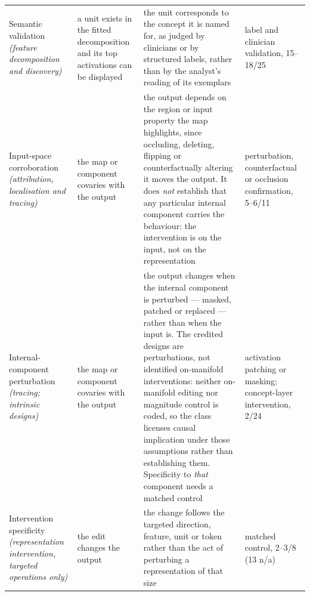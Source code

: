 \begin{table}
\begin{tabular}{@{}L{3.0cm}L{3.6cm}L{10.5cm}L{3.6cm}@{}}
Semantic validation \emph{(feature decomposition and discovery)} & a unit exists in the fitted decomposition and its top activations can be displayed & the unit corresponds to the concept it is named for, as judged by clinicians or by structured labels, rather than by the analyst's reading of its exemplars & label and clinician validation, 15--18/25 \\
Input-space corroboration \emph{(attribution, localisation and tracing)} & the map or component covaries with the output & the output depends on the region or input property the map highlights, since occluding, deleting, flipping or counterfactually altering it moves the output. It does \emph{not} establish that any particular internal component carries the behaviour: the intervention is on the input, not on the representation & perturbation, counterfactual or occlusion confirmation, 5--6/11 \\
Internal-component perturbation \emph{(tracing; intrinsic designs)} & the map or component covaries with the output & the output changes when the internal component is perturbed --- masked, patched or replaced --- rather than when the input is. The credited designs are perturbations, not identified on-manifold interventions: neither on-manifold editing nor magnitude control is coded, so the class licenses causal implication under those assumptions rather than establishing them. Specificity to \emph{that} component needs a matched control & activation patching or masking; concept-layer intervention, 2/24 \\
Intervention specificity \emph{(representation intervention, targeted operations only)} & the edit changes the output & the change follows the targeted direction, feature, unit or token rather than the act of perturbing a representation of that size & matched control, 2--3/8 (13 n/a) \\
\bottomrule
\end{tabular}
\end{table}
